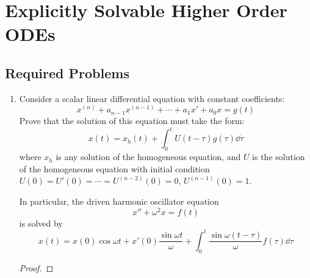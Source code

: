 \documentclass[../psets.tex]{subfiles}
\begin{document}
\section{Explicitly Solvable Higher Order ODEs}
\subsection*{Required Problems}
\begin{enumerate}
    \item {}Consider a scalar linear differential equation with constant coefficients:
    \begin{equation*}
        x^{(n)}+a_{n-1}x^{(n-1)}+\cdots+a_1x'+a_0x = g(t)
    \end{equation*}
    Prove that the solution of this equation must take the form:
    \begin{equation*}
        x(t) = x_h(t)+\int_0^tU(t-\tau)g(\tau)\dd\tau
    \end{equation*}
    where $x_h$ is any solution of the homogeneous equation, and $U$ is the solution of the homogeneous equation with initial condition $U(0)=U'(0)=\cdots=U^{(n-2)}(0)=0$, $U^{(n-1)}(0)=1$.\par
    In particular, the driven harmonic oscillator equation
    \begin{equation*}
        x''+\omega^2x = f(t)
    \end{equation*}
    is solved by
    \begin{equation*}
        x(t) = x(0)\cos\omega t+x'(0)\frac{\sin\omega t}{\omega}+\int_0^t\frac{\sin\omega(t-\tau)}{\omega}f(\tau)\dd\tau
    \end{equation*}
    \begin{proof}


\end{proof}
\end{enumerate}
\end{document}
